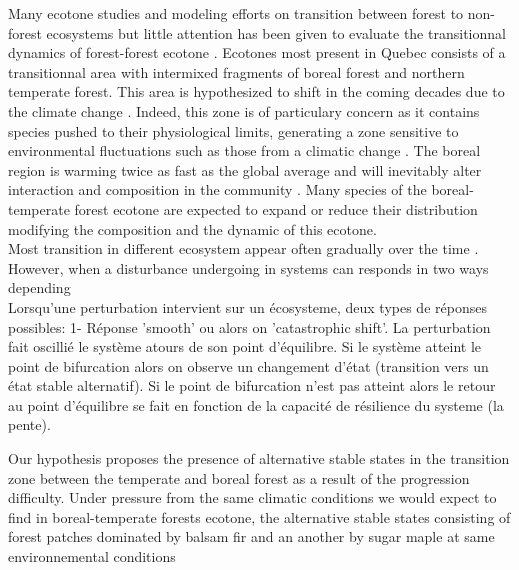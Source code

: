 
Many ecotone studies and modeling efforts on transition between forest to non-forest ecosystems \cite{Scheffer2012,Scheffer2001,Hirota2011} but little attention has been given to evaluate the transitionnal dynamics of forest-forest ecotone \cite{Goldblum2010,Graignic2013}. Ecotones most present in Quebec consists of a transitionnal area with intermixed fragments of boreal forest and northern temperate forest\cite{Goldblum2010}. This area is hypothesized to shift in the coming decades due to the climate change \cite{Scheffer2012}. Indeed, this zone is of particulary concern as it contains species pushed to their physiological limits, generating a zone sensitive to environmental fluctuations such as those from a climatic change \cite{Messaoud2007,Goldblum2010}. The boreal region is warming twice as fast as the global average and will inevitably alter interaction and composition in the community \cite{Scheffer2012,Hughes2000}. Many species of the boreal-temperate forest ecotone are expected to expand or reduce their distribution \cite{Graignic2013,Goldblum2005,Hughes2000} modifying the composition and the dynamic of this ecotone.\\


Most transition in different ecosystem appear often gradually over the time \cite{Scheffer2001,scheffer2009critical}. However, when a disturbance undergoing in systems can responds in two ways depending   \\

 Lorsqu'une perturbation intervient sur un écosysteme, deux types de réponses possibles: 1- Réponse 'smooth' ou alors on 'catastrophic shift'. La perturbation fait oscillié le système atours de son point d'équilibre. Si le système atteint le point de bifurcation alors on observe un changement d'état (transition vers un état stable alternatif). Si le point de bifurcation n'est pas atteint alors le retour au point d'équilibre se fait en fonction de la capacité de résilience du systeme (la pente).  

Our hypothesis proposes the presence of alternative stable states in the transition zone between the temperate and boreal forest as a result of the progression difficulty. Under pressure from the same climatic conditions we would expect to find in boreal-temperate forests ecotone, the alternative stable states consisting of forest patches dominated by balsam fir and an another by sugar maple at same environnemental conditions\\ 

